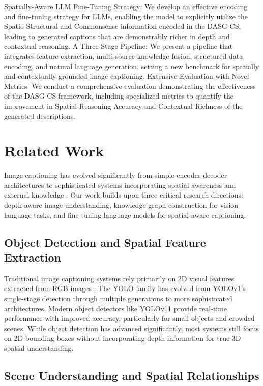 \documentclass[runningheads,14pt]{llncs}
\begin{document}
Spatially-Aware LLM Fine-Tuning Strategy: We develop an effective encoding and fine-tuning strategy for LLMs, enabling the model to explicitly utilize the Spatio-Structural and Commonsense information encoded in the DASG-CS, leading to generated captions that are demonstrably richer in depth and contextual reasoning.
A Three-Stage Pipeline: We present a pipeline that integrates feature extraction, multi-source knowledge fusion, structured data encoding, and natural language generation, setting a new benchmark for spatially and contextually grounded image captioning.
Extensive Evaluation with Novel Metrics: We conduct a comprehensive evaluation demonstrating the effectiveness of the DASG-CS framework, including specialized metrics to quantify the improvement in Spatial Reasoning Accuracy and Contextual Richness of the generated descriptions.
\section{Related Work}

Image captioning has evolved significantly from simple encoder-decoder architectures \cite{vinyals2015show} to sophisticated systems incorporating spatial awareness and external knowledge \cite{anderson2018bottom}. Our work builds upon three critical research directions: depth-aware image understanding, knowledge graph construction for vision-language tasks, and fine-tuning language models for spatial-aware captioning.

\subsection{Object Detection and Spatial Feature Extraction}

Traditional image captioning systems rely primarily on 2D visual features extracted from RGB images \cite{xu2015show, anderson2018bottom}. The YOLO family has evolved from YOLOv1's single-stage detection \cite{redmon2016you} through multiple generations \cite{bochkovskiy2020yolov4, YOLOv7_ref, YOLO_family_ref} to more sophisticated architectures. Modern object detectors like YOLOv11 provide real-time performance with improved accuracy, particularly for small objects and crowded scenes. While object detection has advanced significantly, most systems still focus on 2D bounding boxes without incorporating depth information for true 3D spatial understanding.

\subsection{Scene Understanding and Spatial Relationships}
\end{document}
